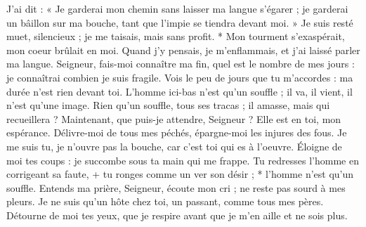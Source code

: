 J'ai dit : « Je garderai mon chemin sans laisser ma langue s'égarer ; je garderai un bâillon sur ma bouche, tant que l'impie se tiendra devant moi. »
\versseparator
Je suis resté muet, silencieux ; je me taisais, mais sans profit. * Mon tourment s'exaspérait,
\versseparator
mon coeur brûlait en moi. Quand j'y pensais, je m'enflammais, et j'ai laissé parler ma langue.
\versseparator
Seigneur, fais-moi connaître ma fin, quel est le nombre de mes jours : je connaîtrai combien je suis fragile.
\versseparator
Vois le peu de jours que tu m'accordes : ma durée n'est rien devant toi. L'homme ici-bas n'est qu'un souffle ;
\versseparator
il va, il vient, il n'est qu'une image. Rien qu'un souffle, tous ses tracas ; il amasse, mais qui recueillera ?
\versseparator
Maintenant, que puis-je attendre, Seigneur ? Elle est en toi, mon espérance.
\versseparator
Délivre-moi de tous mes péchés, épargne-moi les injures des fous.
\versseparator
Je me suis tu, je n'ouvre pas la bouche, car c'est toi qui es à l'oeuvre.
\versseparator
Éloigne de moi tes coups : je succombe sous ta main qui me frappe.
\versseparator
Tu redresses l'homme en corrigeant sa faute, + tu ronges comme un ver son désir ; * l'homme n'est qu'un souffle.
\versseparator
Entends ma prière, Seigneur, écoute mon cri ; ne reste pas sourd à mes pleurs. Je ne suis qu'un hôte chez toi, un passant, comme tous mes pères.
\versseparator
Détourne de moi tes yeux, que je respire avant que je m'en aille et ne sois plus.
